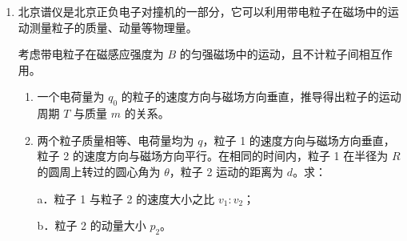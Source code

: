 \documentclass[\gkver]{gaokaozhenti}
\begin{document}
\begin{enumerate}
\item
北京谱仪是北京正负电子对撞机的一部分，它可以利用带电粒子在磁场中的运动测量粒子的质量、动量等物理量。

考虑带电粒子在磁感应强度为 $B$ 的匀强磁场中的运动，且不计粒子间相互作用。
\begin{enumerate}
	\item
	一个电荷量为 $q_{0}$ 的粒子的速度方向与磁场方向垂直，推导得出粒子的运动周期 $T$ 与质量 $m$ 的关系。
	\item
	两个粒子质量相等、电荷量均为 $q$，粒子 1 的速度方向与磁场方向垂直，粒子 2 的速度方向与磁场方向平行。在相同的时间内，粒子 1 在半径为 $R$ 的圆周上转过的圆心角为 $\theta$，粒子 2 运动的距离为 $d$。求：

	a．粒子 1 与粒子 2 的速度大小之比 $v_{1}:v_{2}$；

	b．粒子 2 的动量大小 $p_{2}$。
\end{enumerate}

\end{enumerate}
\end{document}
